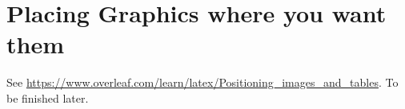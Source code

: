 \section{Placing Graphics where you want them}\label{sec:graphics-positioning}

See \url{https://www.overleaf.com/learn/latex/Positioning_images_and_tables}. To be finished later.